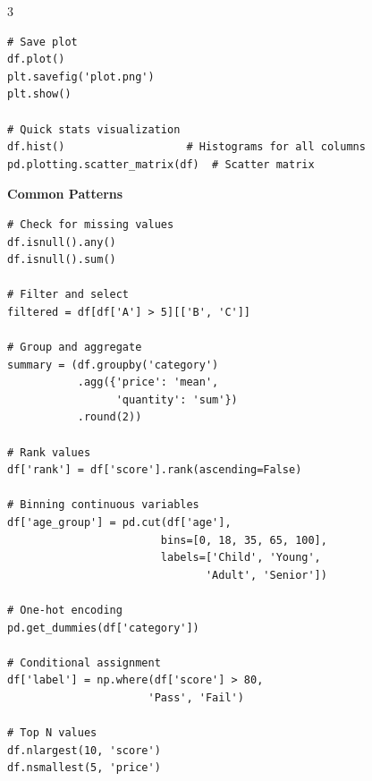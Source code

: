 \documentclass[10pt,landscape,letterpaper]{article}
\newcommand{\sect}[1]{\textbf{\color{blue}#1}}
\begin{document}
\begin{multicols}{3}
\begin{lstlisting}
# Save plot
df.plot()
plt.savefig('plot.png')
plt.show()

# Quick stats visualization
df.hist()                   # Histograms for all columns
pd.plotting.scatter_matrix(df)  # Scatter matrix
\end{lstlisting}

\sect{Common Patterns}
\begin{lstlisting}
# Check for missing values
df.isnull().any()
df.isnull().sum()

# Filter and select
filtered = df[df['A'] > 5][['B', 'C']]

# Group and aggregate
summary = (df.groupby('category')
           .agg({'price': 'mean', 
                 'quantity': 'sum'})
           .round(2))

# Rank values
df['rank'] = df['score'].rank(ascending=False)

# Binning continuous variables
df['age_group'] = pd.cut(df['age'], 
                        bins=[0, 18, 35, 65, 100],
                        labels=['Child', 'Young', 
                               'Adult', 'Senior'])

# One-hot encoding
pd.get_dummies(df['category'])

# Conditional assignment
df['label'] = np.where(df['score'] > 80, 
                      'Pass', 'Fail')

# Top N values
df.nlargest(10, 'score')
df.nsmallest(5, 'price')
\end{lstlisting}

\end{multicols}
\end{document}
